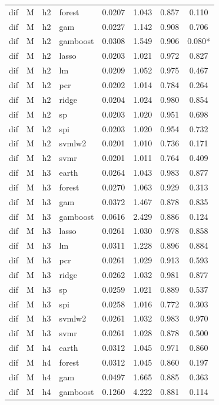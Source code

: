 \begin{ThreePartTable}
\begin{longtable}[t]{llclcccc}
dif & M & h2 & forest & 0.0207 & 1.043 & 0.857 & 0.110\\
dif & M & h2 & gam & 0.0227 & 1.142 & 0.908 & 0.706\\
dif & M & h2 & gamboost & 0.0308 & 1.549 & 0.906 & 0.080*\\
dif & M & h2 & lasso & 0.0203 & 1.021 & 0.972 & 0.827\\
dif & M & h2 & lm & 0.0209 & 1.052 & 0.975 & 0.467\\
dif & M & h2 & pcr & 0.0202 & 1.014 & 0.784 & 0.264\\
dif & M & h2 & ridge & 0.0204 & 1.024 & 0.980 & 0.854\\
dif & M & h2 & sp & 0.0203 & 1.020 & 0.951 & 0.698\\
dif & M & h2 & spi & 0.0203 & 1.020 & 0.954 & 0.732\\
dif & M & h2 & svmlw2 & 0.0201 & 1.010 & 0.736 & 0.171\\
dif & M & h2 & svmr & 0.0201 & 1.011 & 0.764 & 0.409\\
\addlinespace
dif & M & h3 & earth & 0.0264 & 1.043 & 0.983 & 0.877\\
dif & M & h3 & forest & 0.0270 & 1.063 & 0.929 & 0.313\\
dif & M & h3 & gam & 0.0372 & 1.467 & 0.878 & 0.835\\
dif & M & h3 & gamboost & 0.0616 & 2.429 & 0.886 & 0.124\\
dif & M & h3 & lasso & 0.0261 & 1.030 & 0.978 & 0.858\\
dif & M & h3 & lm & 0.0311 & 1.228 & 0.896 & 0.884\\
dif & M & h3 & pcr & 0.0261 & 1.029 & 0.913 & 0.593\\
dif & M & h3 & ridge & 0.0262 & 1.032 & 0.981 & 0.877\\
dif & M & h3 & sp & 0.0259 & 1.021 & 0.889 & 0.537\\
dif & M & h3 & spi & 0.0258 & 1.016 & 0.772 & 0.303\\
dif & M & h3 & svmlw2 & 0.0261 & 1.032 & 0.983 & 0.970\\
dif & M & h3 & svmr & 0.0261 & 1.028 & 0.878 & 0.500\\
\addlinespace
dif & M & h4 & earth & 0.0312 & 1.045 & 0.971 & 0.860\\
dif & M & h4 & forest & 0.0312 & 1.045 & 0.860 & 0.197\\
dif & M & h4 & gam & 0.0497 & 1.665 & 0.885 & 0.363\\
dif & M & h4 & gamboost & 0.1260 & 4.222 & 0.881 & 0.114\\

\end{longtable}
\end{ThreePartTable}
